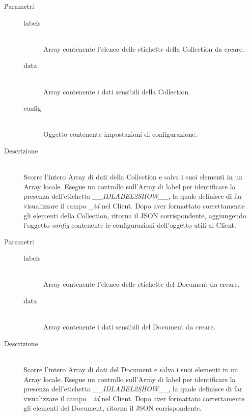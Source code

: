 \begin{description}
\begin{mldescription}
   \hfill
   \begin{description}
    \item[Parametri]
     \begin{description}
      \item[labels] \hfill \\
      Array contenente l'elenco delle etichette della Collection da creare.
      \item[data] \hfill \\
      Array contenente i dati sensibili della Collection.      
      \item[config] \hfill \\
      Oggetto contenente impostazioni di configurazione.      
     \end{description}
    \item[Descrizione] \hfill \\
    Scorre l'intero Array di dati della Collection e salva i suoi elementi in un Array locale. Esegue un controllo sull'Array di label per identificare la presenza dell'etichetta \textit{\_\_IDLABEL2SHOW\_\_}, la quale definisce di far visualizzare il campo \textit{\_id} nel Client. Dopo aver formattato correttamente gli elementi della Collection, ritorna il JSON corrispondente, aggiungendo l'oggetto \textit{config} contenente le configurazioni dell'oggetto utili al Client.
   \end{description}
   
    \hfill
   \begin{description}
    \item[Parametri]
     \begin{description}
      \item[labels] \hfill \\
      Array contenente l'elenco delle etichette del Document da creare.
      \item[data] \hfill \\
      Array contenente i dati sensibili del Document da creare.
     \end{description}
    \item[Descrizione] \hfill \\
    Scorre l'intero Array di dati del Document e salva i suoi elementi in un Array locale. Esegue un controllo sull'Array di label per identificare la presenza dell'etichetta \textit{\_\_IDLABEL2SHOW\_\_}, la quale definisce di far visualizzare il campo \textit{\_id} nel Client. Dopo aver formattato correttamente gli elementi del Document, ritorna il JSON corrispondente.
   \end{description}
   

\end{mldescription}
\end{description}
